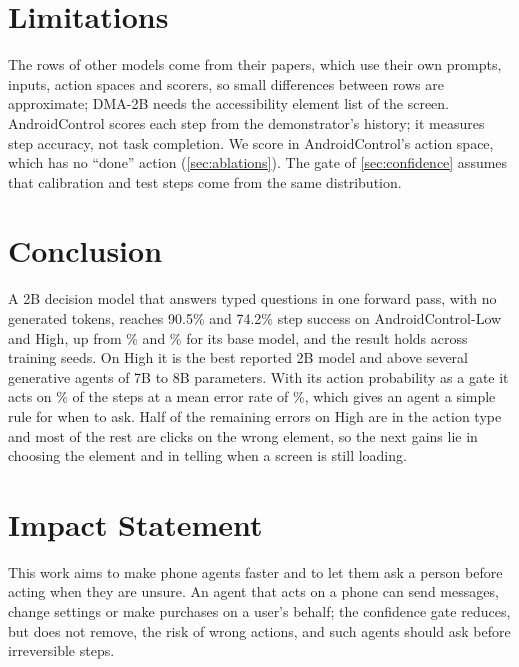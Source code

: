 \documentclass{article}
\newcommand{\ours}{DMA-2B}
\begin{document}
\section{Limitations}
The rows of other models come from their papers, which use their own prompts, inputs, action spaces and scorers, so
small differences between rows are approximate; \ours{} needs the accessibility element list of the screen. AndroidControl scores each step from the demonstrator's history; it
measures step accuracy, not task completion. We score in AndroidControl's action space, which has no ``done''
action (\cref{sec:ablations}). The gate of \cref{sec:confidence} assumes that calibration and test steps come from
the same distribution.

\section{Conclusion}
A 2B decision model that answers typed questions in one forward pass, with no generated tokens, reaches 90.5\% and
74.2\% step success on AndroidControl-Low and High, up from \BASELOW\% and \BASEHIGH\% for its base model, and the result
holds across training seeds. On High it is the best reported 2B model and above several generative agents of 7B to 8B
parameters. With its action probability as a gate it acts on \OURSCOVTWENTY\% of the steps at a mean error
rate of \OURSRISKTWENTY\%, which gives an agent a simple rule for when to ask. Half of the remaining errors on High are
in the action type and most of the rest are clicks on the wrong element, so the next gains lie in choosing the
element and in telling when a screen is still loading.

\section*{Impact Statement}
This work aims to make phone agents faster and to let them ask a person before acting when they are unsure. An agent
that acts on a phone can send messages, change settings or make purchases on a user's behalf; the confidence gate
reduces, but does not remove, the risk of wrong actions, and such agents should ask before irreversible steps.



\end{document}
